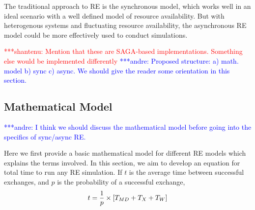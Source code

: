 \documentclass{rspublic}
\newcommand{\jhanote}[1]{ {\textcolor{red} { ***shantenu: #1 }}}
\newcommand{\alnote}[1]{ {\textcolor{blue} { ***andre: #1 }}}
\newcommand{\alnote}[1]{}
\newcommand{\jhanote}[1]{}
\begin{document}
The traditional approach to RE is the synchronous model, which works
well in an ideal scenario with a well defined model of resource
availability. But with heterogenous systems and fluctuating resource
availability, the asynchronous RE model could be more effectively used
to conduct simulations.




\jhanote{Mention that these are SAGA-based implementations. Something
  else would be implemented differently}
\alnote{Proposed structure: a) math. model b) sync c) async. We should give the reader some orientation in this section.}

\subsection{Mathematical Model}
\alnote{I think we should discuss the mathematical model before going into the specifics of sync/async RE.}

Here we first provide a basic mathematical model for different RE
models which explains the terms involved. In this section, we aim to
develop an equation for total time to run any RE simulation. If $t$ is
the average time between successful exchanges, and $p$ is the
probability of a successful exchange,
\begin{eqnarray}
t=  {1 \over p} \times {[T_{MD} + T_{X} + T_{W}]} 
\label{eq:timebtw}
\end{eqnarray}
\end{document}
